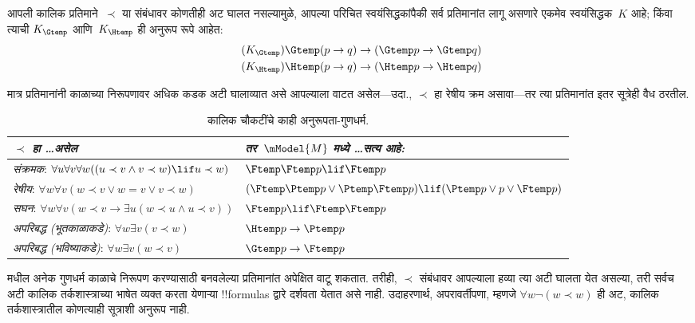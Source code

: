 \documentclass[../../../include/open-logic-section]{subfiles}
\begin{document}


आपली कालिक प्रतिमाने~$\prec$ या संबंधावर कोणतीही
अट घालत नसल्यामुळे, आपल्या परिचित स्वयंसिद्धकांपैकी
सर्व प्रतिमानांत लागू असणारे एकमेव स्वयंसिद्धक~$K$
आहे; किंवा त्याची $K_{\Gtemp}$ आणि~$K_{\Htemp}$
ही अनुरूप रूपे आहेत:
\begin{align*}
\tag{$K_{\Gtemp}$}  \Gtemp (p \to q) & \to (\Gtemp p \to \Gtemp q)\\
\tag{$K_{\Htemp}$}  \Htemp (p \to q) & \to (\Htemp p \to \Htemp q)
\end{align*}

मात्र प्रतिमानांनी काळाच्या निरूपणावर अधिक कडक
अटी घालाव्यात असे आपल्याला वाटत असेल—उदा.,
$\prec$ हा रेषीय क्रम असावा—तर त्या प्रतिमानांत
इतर सूत्रेही वैध ठरतील.

\begin{table}[t]
  \begin{tabular}{| p{} || p{} |}
    \hline
    {\emph{$\prec$ हा \dots असेल}} & {\emph{तर~$\mModel{M}$ मध्ये \dots सत्य आहे:}} \\
    \hline \hline
    \emph{संक्रमक}: \newline
    $\forall u \forall v \forall w ((u \prec v \land v \prec w) \lif u \prec w)$ &
    $\Ftemp \Ftemp p \lif \Ftemp p$  \\
    \hline
    \emph{रेषीय}: \newline
    $\forall w \forall v (w \prec v \lor w = v \lor v \prec w)$ &
    $(\Ftemp \Ptemp  p \lor \Ptemp \Ftemp p) \lif (\Ptemp p \lor p \lor \Ftemp p)$\\
    \hline
    \emph{सघन}: \newline
    $\forall w \forall v (w \prec v \to \exists u(w \prec u \land u \prec v))$ &
    $\Ftemp p \lif \Ftemp \Ftemp p$ \\
    \hline
    \emph{अपरिबद्ध (भूतकाळाकडे)}: \newline
    $\forall w \exists v( v \prec w)$ &
    $\Htemp p \to \Ptemp p$ \\
    \hline
    \emph{अपरिबद्ध (भविष्याकडे)}: \newline
    $\forall w \exists v( w \prec v)$ &
    $\Gtemp p \to \Ftemp p$ \\
    \hline
  \end{tabular}
  \caption{कालिक चौकटींचे काही अनुरूपता-गुणधर्म.}
\end{table}

 मधील अनेक गुणधर्म काळाचे
निरूपण करण्यासाठी बनवलेल्या प्रतिमानांत अपेक्षित
वाटू शकतात. तरीही, $\prec$ संबंधावर आपल्याला
हव्या त्या अटी घालता येत असल्या, तरी सर्वच अटी
कालिक तर्कशास्त्राच्या भाषेत व्यक्त करता येणाऱ्या
!!{formula}s द्वारे दर्शवता येतात असे नाही. उदाहरणार्थ,
अपरावर्तीपणा, म्हणजे $\forall w \lnot (w \prec w)$
ही अट, कालिक तर्कशास्त्रातील कोणत्याही सूत्राशी
अनुरूप नाही.
\end{document}
